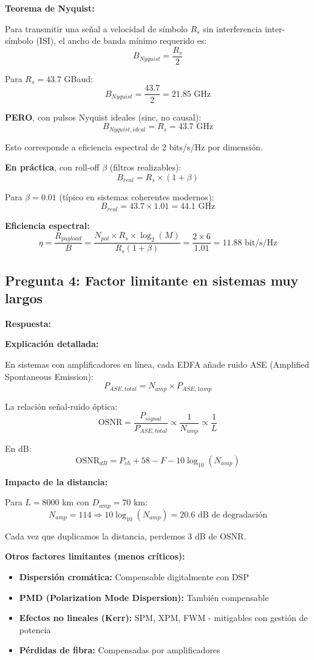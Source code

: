 \documentclass[a4paper,10pt]{article}
\begin{document}
\textbf{Teorema de Nyquist:}

Para transmitir una señal a velocidad de símbolo $R_s$ sin interferencia inter-símbolo (ISI), el ancho de banda mínimo requerido es:
$$\boxed{B_{Nyquist} = \frac{R_s}{2}}$$

Para $R_s = 43.7$ GBaud:
$$B_{Nyquist} = \frac{43.7}{2} = 21.85 \text{ GHz}$$

\textbf{PERO}, con pulsos Nyquist ideales (sinc, no causal):
$$\boxed{B_{Nyquist,ideal} = R_s = 43.7 \text{ GHz}}$$

Esto corresponde a eficiencia espectral de 2 bits/s/Hz por dimensión.

\textbf{En práctica}, con roll-off $\beta$ (filtros realizables):
$$B_{real} = R_s \times (1 + \beta)$$

Para $\beta = 0.01$ (típico en sistemas coherentes modernos):
$$\boxed{B_{real} = 43.7 \times 1.01 = 44.1 \text{ GHz}}$$

\textbf{Eficiencia espectral:}
$$\eta = \frac{R_{payload}}{B} = \frac{N_{pol} \times R_s \times \log_2(M)}{R_s(1+\beta)} = \frac{2 \times 6}{1.01} = \boxed{11.88 \text{ bit/s/Hz}}$$

\subsection{Pregunta 4: Factor limitante en sistemas muy largos}

\textbf{Respuesta:} 

\textbf{Explicación detallada:}

En sistemas con amplificadores en línea, cada EDFA añade ruido ASE (Amplified Spontaneous Emission):
$$P_{ASE,total} = N_{amp} \times P_{ASE,1amp}$$

La relación señal-ruido óptica:
$$\text{OSNR} = \frac{P_{signal}}{P_{ASE,total}} \propto \frac{1}{N_{amp}} \propto \frac{1}{L}$$

En dB:
$$\text{OSNR}_{dB} = P_{ch} + 58 - F - 10\log_{10}(N_{amp})$$

\textbf{Impacto de la distancia:}

Para $L = 8000$ km con $D_{amp} = 70$ km:
$$N_{amp} = 114 \Rightarrow 10\log_{10}(N_{amp}) = 20.6 \text{ dB de degradación}$$

Cada vez que duplicamos la distancia, perdemos 3 dB de OSNR.

\textbf{Otros factores limitantes (menos críticos):}
\begin{itemize}
    \item \textbf{Dispersión cromática:} Compensable digitalmente con DSP
    \item \textbf{PMD (Polarization Mode Dispersion):} También compensable
    \item \textbf{Efectos no lineales (Kerr):} SPM, XPM, FWM - mitigables con gestión de potencia
    \item \textbf{Pérdidas de fibra:} Compensadas por amplificadores
\end{itemize}
\end{document}
